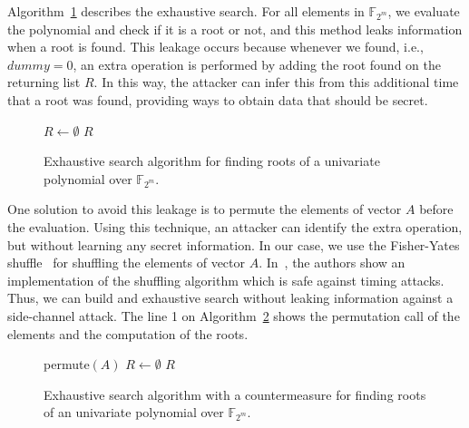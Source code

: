 Algorithm~\ref{alg:exhaustive} describes the exhaustive search. For all elements in $\mathbb{F}_{2^m}$, we evaluate the polynomial and check if it is a root or not, and this method leaks information when a root is found. This leakage occurs because whenever we found, i.e., $dummy = 0$, an extra operation is performed by adding the root found on the returning list $R$. In this way, the attacker can infer this from this additional time that a root was found, providing ways to obtain data that should be secret.

\begin{figure}[ht]
\begin{algorithm}[H]
 $R \gets \emptyset$\;
\Return $R$\;
  \caption{Exhaustive search algorithm for finding roots of a univariate polynomial over $\mathbb{F}_{2^m}$.}\label{alg:exhaustive}
\end{algorithm}
\end{figure}

One solution to avoid this leakage is to permute the elements of vector $A$ before the evaluation. Using this technique, an attacker can identify the extra operation, but without learning any secret information. In our case, we use the Fisher-Yates shuffle~\cite{black2005fisher} for shuffling the elements of vector $A$. In~\cite{wang2018fpga}, the authors show an implementation of the shuffling algorithm which is safe against timing attacks. Thus, we can build and exhaustive search without leaking information against a side-channel attack. The line 1 on Algorithm~\ref{alg:exhaustive_permuted} shows the permutation call of the elements and the computation of the roots.

\begin{figure}[ht]
\begin{algorithm}[H]
  permute$(A)$\;
 $R \gets \emptyset$\;
\Return $R$\;
 \caption{Exhaustive search algorithm with a countermeasure for finding roots of an univariate polynomial over $\mathbb{F}_{2^m}$.}
  \label{alg:exhaustive_permuted}
\end{algorithm}
\end{figure}

